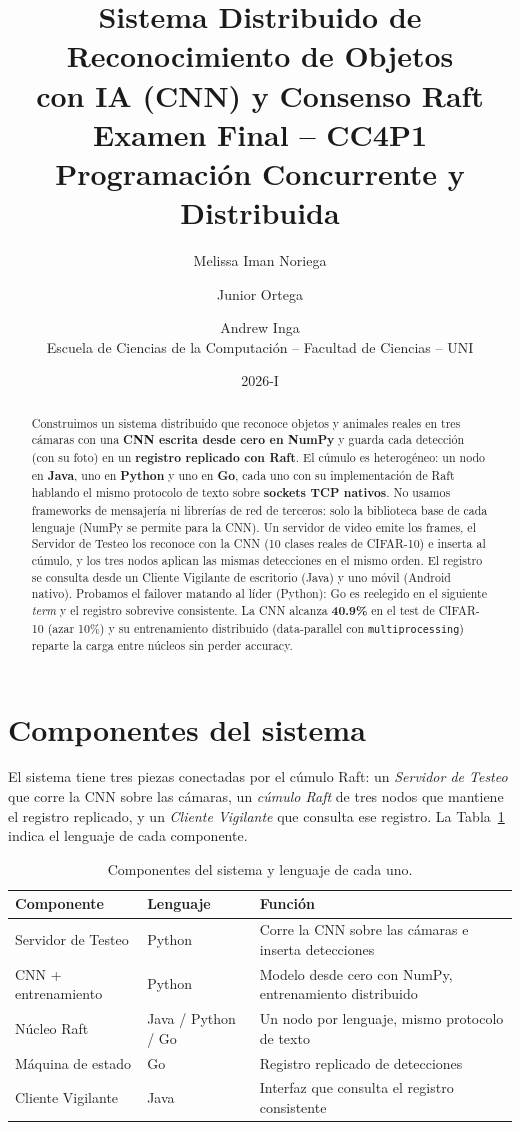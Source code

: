 \documentclass[11pt,a4paper]{article}
\title{\vspace{-1cm}\textbf{Sistema Distribuido de Reconocimiento de Objetos\\
con IA (CNN) y Consenso Raft}\\[2pt]
\large Examen Final -- CC4P1 Programaci\'on Concurrente y Distribuida}
\author{Melissa Iman Noriega \and Junior Ortega \and Andrew Inga\\[3pt]
\small Escuela de Ciencias de la Computaci\'on -- Facultad de Ciencias -- UNI}
\date{2026-I}
\begin{document}
\maketitle
\thispagestyle{fancy}

\begin{abstract}
\noindent Construimos un sistema distribuido que reconoce objetos y animales
reales en tres c\'amaras con una \textbf{CNN escrita desde cero en NumPy} y guarda
cada detecci\'on (con su foto) en un \textbf{registro replicado con Raft}. El
c\'umulo es heterog\'eneo: un nodo en \textbf{Java}, uno en \textbf{Python} y uno
en \textbf{Go}, cada uno con su implementaci\'on de Raft hablando el mismo
protocolo de texto sobre \textbf{sockets TCP nativos}. No usamos frameworks de
mensajer\'ia ni librer\'ias de red de terceros: solo la biblioteca base de cada
lenguaje (NumPy se permite para la CNN). Un servidor de video emite los frames,
el Servidor de Testeo los reconoce con la CNN (10 clases reales de CIFAR-10) e
inserta al c\'umulo, y los tres nodos aplican las mismas detecciones en el mismo
orden. El registro se consulta desde un Cliente Vigilante de escritorio (Java) y
uno m\'ovil (Android nativo). Probamos el failover matando al l\'ider (Python):
Go es reelegido en el siguiente \emph{term} y el registro sobrevive consistente.
La CNN alcanza \textbf{40.9\%} en el test de CIFAR-10 (azar 10\%) y su
entrenamiento distribuido (data-parallel con \texttt{multiprocessing}) reparte la
carga entre n\'ucleos sin perder accuracy.
\end{abstract}

\section{Componentes del sistema}
El sistema tiene tres piezas conectadas por el c\'umulo Raft: un \emph{Servidor de
Testeo} que corre la CNN sobre las c\'amaras, un \emph{c\'umulo Raft} de tres nodos
que mantiene el registro replicado, y un \emph{Cliente Vigilante} que consulta ese
registro. La Tabla~\ref{tab:comp} indica el lenguaje de cada componente.

\begin{table}[h]\centering\small
\begin{tabular}{@{}lll@{}}
\toprule
\textbf{Componente} & \textbf{Lenguaje} & \textbf{Funci\'on} \\
\midrule
Servidor de Testeo & Python & Corre la CNN sobre las c\'amaras e inserta detecciones \\
CNN + entrenamiento & Python & Modelo desde cero con NumPy, entrenamiento distribuido \\
N\'ucleo Raft & Java / Python / Go & Un nodo por lenguaje, mismo protocolo de texto \\
M\'aquina de estado & Go & Registro replicado de detecciones \\
Cliente Vigilante & Java & Interfaz que consulta el registro consistente \\
\bottomrule
\end{tabular}
\caption{Componentes del sistema y lenguaje de cada uno.}\label{tab:comp}
\end{table}
\end{document}
